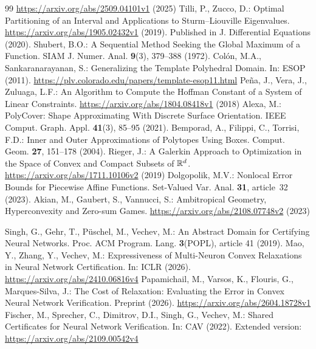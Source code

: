 \begin{thebibliography}{99}
\url{https://arxiv.org/abs/2509.04101v1} (2025)
Tilli, P., Zucco, D.: Optimal Partitioning of an Interval and Applications to Sturm--Liouville Eigenvalues.
\url{https://arxiv.org/abs/1905.02432v1} (2019).
Published in J. Differential Equations (2020).
Shubert, B.O.: A Sequential Method Seeking the Global Maximum of a Function.
SIAM J. Numer. Anal. \textbf{9}(3), 379--388 (1972).
Col\'{o}n, M.A., Sankaranarayanan, S.: Generalizing the Template Polyhedral Domain.
In: ESOP (2011).
\url{https://plv.colorado.edu/papers/template-esop11.html}
Pe\~na, J., Vera, J., Zuluaga, L.F.: An Algorithm to Compute the Hoffman Constant of a System of Linear Constraints.
\url{https://arxiv.org/abs/1804.08418v1} (2018)
Alexa, M.: PolyCover: Shape Approximating With Discrete Surface Orientation.
IEEE Comput. Graph. Appl. \textbf{41}(3), 85--95 (2021).
Bemporad, A., Filippi, C., Torrisi, F.D.: Inner and Outer Approximations of Polytopes Using Boxes.
Comput. Geom. \textbf{27}, 151--178 (2004).
Rieger, J.: A Galerkin Approach to Optimization in the Space of Convex and Compact Subsets of $\mathbb R^d$.
\url{https://arxiv.org/abs/1711.10106v2} (2019)
Dolgopolik, M.V.: Nonlocal Error Bounds for Piecewise Affine Functions.
Set-Valued Var. Anal. \textbf{31}, article~32 (2023).
Akian, M., Gaubert, S., Vannucci, S.: Ambitropical Geometry, Hyperconvexity and Zero-sum Games.
\url{https://arxiv.org/abs/2108.07748v2} (2023)

Singh, G., Gehr, T., P\"uschel, M., Vechev, M.: An Abstract Domain for Certifying Neural Networks. Proc. ACM Program. Lang. \textbf{3}(POPL), article 41 (2019). 
Mao, Y., Zhang, Y., Vechev, M.: Expressiveness of Multi-Neuron Convex Relaxations in Neural Network Certification. In: ICLR (2026). \url{https://arxiv.org/abs/2410.06816v4}
Papamichail, M., Varsos, K., Flouris, G., Marques-Silva, J.: The Cost of Relaxation: Evaluating the Error in Convex Neural Network Verification. Preprint (2026). \url{https://arxiv.org/abs/2604.18728v1}
Fischer, M., Sprecher, C., Dimitrov, D.I., Singh, G., Vechev, M.: Shared Certificates for Neural Network Verification. In: CAV (2022). Extended version: \url{https://arxiv.org/abs/2109.00542v4}
\end{thebibliography}

